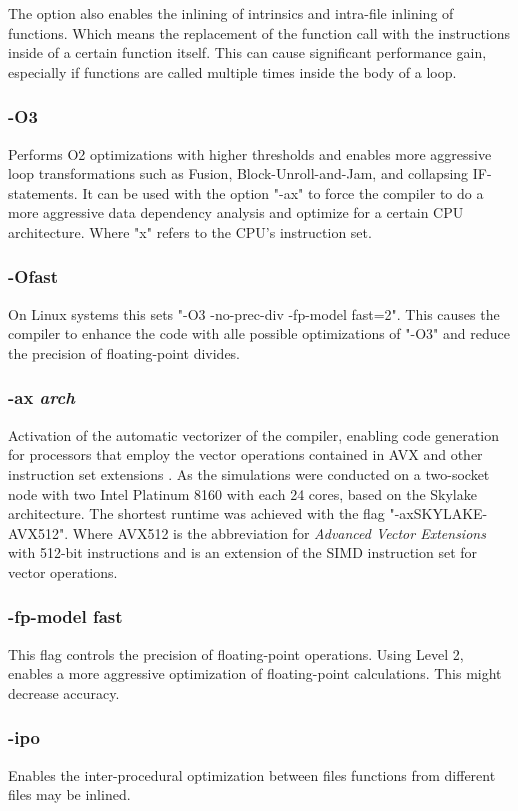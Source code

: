 The option also enables the inlining of intrinsics and intra-file inlining of functions. Which means the replacement of the function call with the instructions inside of a certain function itself. This can cause significant performance gain, especially if functions are called multiple times inside the body of a loop.

\subsubsection*{-O3}
Performs O2 optimizations with higher thresholds and enables more aggressive loop transformations such as Fusion, Block-Unroll-and-Jam, and collapsing IF-statements. It can be used with the option "-ax" to force the compiler to do a more aggressive data dependency analysis and optimize for a certain CPU architecture. Where "x" refers to the CPU's instruction set.

\subsubsection*{-Ofast}
On Linux systems this sets "-O3 -no-prec-div -fp-model fast=2". This causes the compiler to enhance the code with alle possible optimizations of "-O3" and reduce the precision of floating-point divides.

\subsubsection*{-ax \textit{arch}}
Activation of the automatic vectorizer of the compiler, enabling code generation for processors that employ the vector operations contained in AVX and other instruction set extensions . As the simulations were conducted on a two-socket node with two Intel Platinum 8160 with each 24 cores, based on the Skylake architecture. The shortest runtime was achieved with the flag "-axSKYLAKE-AVX512". Where AVX512 is the abbreviation for \textit{Advanced Vector Extensions} with 512-bit instructions and is an extension of the SIMD instruction set for vector operations. 

\subsubsection*{-fp-model fast}
This flag controls the precision of floating-point operations. Using Level 2, enables a more aggressive optimization of floating-point calculations. This might decrease accuracy.

\subsubsection*{-ipo}
Enables the inter-procedural optimization between files functions from different files may be inlined.

